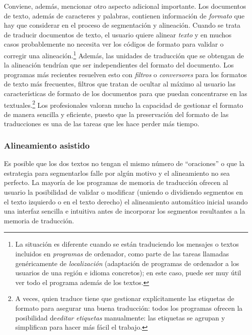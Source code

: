 Conviene, además, mencionar otro aspecto adicional importante. Los documentos de texto, además de caracteres y palabras, contienen información de \emph{formato} que hay que considerar en el proceso de segmentación y alineación. Cuando se trata de traducir documentos de texto, el usuario quiere alinear \emph{texto} y en muchos casos probablemente no necesita ver los códigos de formato para validar o corregir una alineación.\footnote{La situación es diferente cuando se están traduciendo los mensajes o textos incluidos en \emph{programas} de ordenador, como parte de las tareas llamadas genéricamente de \emph{localización} (adaptación de programas de ordenador a los usuarios de una región e idioma concretos); en este caso, puede ser muy útil ver todo el programa además de los textos.} Además, las unidades de traducción que se obtengan de la alineación tendrían que ser independientes del formato del documento. Los programas más recientes resuelven esto con \emph{filtros} o \emph{conversores} para los formatos de texto más frecuentes, filtros que tratan de ocultar al máximo al usuario las características de formato de los documentos para que puedan concentrarse en las textuales.\footnote{A veces, quien traduce tiene que gestionar explícitamente las etiquetas de formato para asegurar una buena traducción: todos los programas ofrecen la posibilidad de\emph{editar etiquetas} manualmente: las etiquetas se agrupan y simplifican para hacer más fácil el trabajo.} Los profesionales valoran mucho la capacidad de gestionar el formato de manera sencilla y eficiente, puesto que la preservación del formato de las traducciones es una de las tareas que les hace perder más tiempo. 

\subsubsection{Alineamiento asistido} 

Es posible que los dos textos no tengan el mismo número de ``oraciones'' o que la estrategia para segmentarlos falle por algún motivo y el alineamiento no sea perfecto. La mayoría de los programas de memoria de traducción ofrecen al usuario la posibilidad de validar o modificar (uniendo o dividiendo segmentos en el texto izquierdo o en el texto derecho) el alineamiento automático inicial usando una interfaz sencilla e intuitiva antes de incorporar los segmentos resultantes a la memoria de traducción. 

